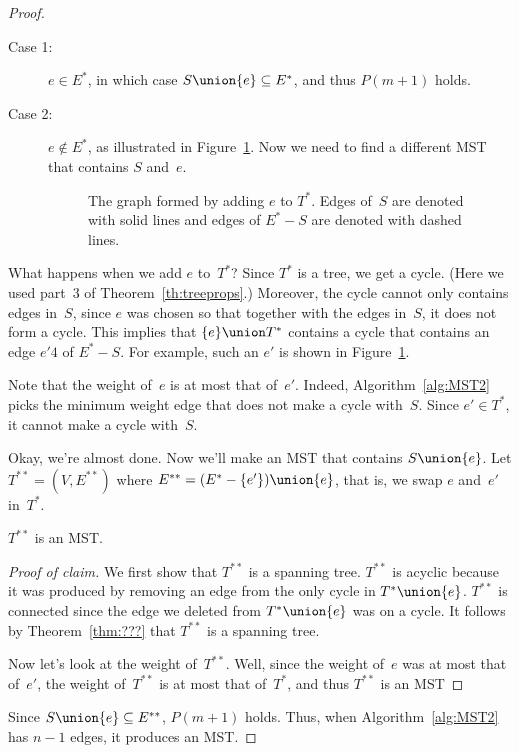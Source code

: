 \begin{proof}
\begin{description}
\item[Case 1:]
$e \in E^*$, in which case $S \union \{e\} \subseteq E^*$, and thus
  $P(m+1)$ holds.

\item[Case 2:]
$e \notin E^*$, as illustrated in Figure~\ref{fig:5KD}.  Now we need
  to find a different MST that contains $S$ and~$e$.

\begin{figure}

\missinggraphic

\caption{The graph formed by adding $e$ to $T^*$.  Edges of~$S$ are
  denoted with solid lines and edges of $E^* - S$ are denoted with
  dashed lines.}

\label{fig:5KD}
\end{figure}

\end{description}

What happens when we add $e$ to~$T^*$?  Since $T^*$ is a tree, we get
a cycle.  (Here we used part~3 of Theorem~\ref{th:treeprops}.)
Moreover, the cycle cannot only contains edges in~$S$, since $e$ was
chosen so that together with the edges in~$S$, it does not form a
cycle.  This implies that $\{e\} \union T^*$ contains a cycle that
contains an edge $e'4$ of $E^* - S$.  For example, such an $e'$ is
shown in Figure~\ref{fig:5KD}.

Note that the weight of~$e$ is at most that of~$e'$.  Indeed,
Algorithm~\ref{alg:MST2} picks the minimum weight edge that does not
make a cycle with~$S$.  Since $e' \in T^*$, it cannot make a cycle
with~$S$.

Okay, we're almost done.  Now we'll make an MST that contains $S
\union \{e\}$.  Let $T^{**} = (V, E^{**})$ where $E^{**} = (E^* -
\{e'\}) \union \{e\}$, that is, we swap $e$ and~$e'$ in~$T^*$.

\begin{claim}\label{claim:MST2}
$T^{**}$ is an MST.
\end{claim}

\begin{proof}[Proof of claim]
We first show that $T^{**}$ is a spanning tree.  
$T^{**}$ is acyclic
because it was produced by removing an edge from the only cycle in
$T^{*} \union \{e\}$.
$T^{**}$ is connected
since the edge we deleted from $T^* \union \{e\}$ was on a cycle.
It follows by Theorem~\ref{thm:???} that $T^{**}$ is a spanning tree.

Now let's look at the weight of~$T^{**}$.  Well, since the weight
of~$e$ was at most that of~$e'$, the weight of~$T^{**}$ is at most
that of~$T^*$, and thus $T^{**}$ is an MST\@
\end{proof}

Since $S \union \{e\} \subseteq E^{**}$, $P(m + 1)$ holds.  Thus, when
Algorithm~\ref{alg:MST2} has $n - 1$ edges, it produces an MST\@.
\end{proof}

